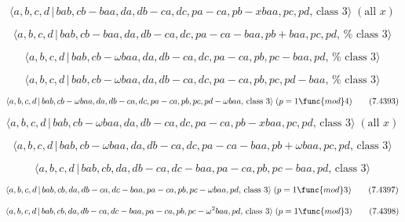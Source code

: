 \documentclass[10pt]{article}
\begin{document}
\begin{equation}
\langle a,b,c,d\,|\,bab,cb-baa,da,db-ca,dc,pa-ca,pb-xbaa,pc,pd,\,\text{class 
}3\rangle \;(\text{all }x)  \tag{7.4389}
\end{equation}

\begin{equation}
\langle a,b,c,d\,|\,bab,cb-baa,da,db-ca,dc,pa-ca-baa,pb+baa,pc,pd,\,\text{%
class }3\rangle  \tag{7.4390}
\end{equation}

\begin{equation}
\langle a,b,c,d\,|\,bab,cb-\omega baa,da,db-ca,dc,pa-ca,pb,pc-baa,pd,\,\text{%
class }3\rangle  \tag{7.4391}
\end{equation}

\begin{equation}
\langle a,b,c,d\,|\,bab,cb-\omega baa,da,db-ca,dc,pa-ca,pb,pc,pd-baa,\,\text{%
class }3\rangle  \tag{7.4392}
\end{equation}

\begin{equation}
\langle a,b,c,d\,|\,bab,cb-\omega baa,da,db-ca,dc,pa-ca,pb,pc,pd-\omega
baa,\,\text{class }3\rangle \;(p=1\func{mod}4)  \tag{7.4393}
\end{equation}

\begin{equation}
\langle a,b,c,d\,|\,bab,cb-\omega baa,da,db-ca,dc,pa-ca,pb-xbaa,pc,pd,\,%
\text{class }3\rangle \;(\text{all }x)  \tag{7.4394}
\end{equation}

\begin{equation}
\langle a,b,c,d\,|\,bab,cb-\omega baa,da,db-ca,dc,pa-ca-baa,pb+\omega
baa,pc,pd,\,\text{class }3\rangle  \tag{7.4395}
\end{equation}

\begin{equation}
\langle a,b,c,d\,|\,bab,cb,da,db-ca,dc-baa,pa-ca,pb,pc-baa,pd,\,\text{class }%
3\rangle  \tag{7.4396}
\end{equation}

\begin{equation}
\langle a,b,c,d\,|\,bab,cb,da,db-ca,dc-baa,pa-ca,pb,pc-\omega baa,pd,\,\text{%
class }3\rangle \;(p=1\func{mod}3)  \tag{7.4397}
\end{equation}

\begin{equation}
\langle a,b,c,d\,|\,bab,cb,da,db-ca,dc-baa,pa-ca,pb,pc-\omega ^{2}baa,pd,\,%
\text{class }3\rangle \;(p=1\func{mod}3)  \tag{7.4398}
\end{equation}
\end{document}
